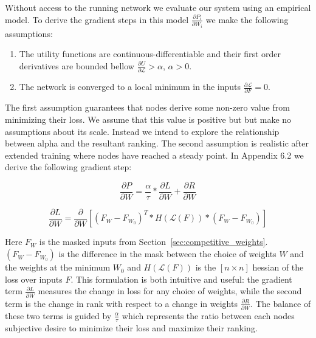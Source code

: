 \documentclass{article}
\begin{document}
Without access to the running network we evaluate our system using an empirical model. To derive the gradient steps in this model $\frac{\partial P_i}{\partial W_i}$ we make the following assumptions: 

\begin{enumerate}
	\item The utility functions are continuous-differentiable and their first order derivatives are bounded bellow $\frac{\partial U}{\partial \mathcal{L}} > \alpha$, $\alpha > 0$.     
	\item  The network is converged to a local minimum in the inputs $\frac{\partial\mathcal{L}}{\partial F} = 0$.
\end{enumerate}  

The first assumption guarantees that nodes derive some non-zero value from minimizing their loss. We assume that this value is positive but but make no assumptions about its scale. Instead we intend to explore the relationship between alpha and the resultant ranking. The second assumption is realistic after extended training where nodes have reached a steady point. In Appendix 6.2 we derive the following gradient step:

\begin{equation}
\label{eq:iterative_descent1}
\frac{\partial P}{\partial W} = \frac{\alpha}{\tau} * \frac{\partial L}{\partial W} + \frac{\partial R}{\partial W}
\end{equation}


\begin{equation}
\label{eq:iterative_descent2}
\frac{\partial L}{\partial W} = \frac{\partial}{\partial W} [(F_W - F_{W_0})^T * H( \mathcal{L}(F)) * (F_W - F_{W_0})] 
\end{equation}

Here $F_W$ is the masked inputs from Section~\ref{sec:competitive_weights}. $(F_W - F_{W_0})$ is the difference in the mask between the choice of weights $W$ and the weights at the minimum $W_0$ and $H( \mathcal{L}(F))$ is the $[n \times n]$ hessian of the loss over inputs $F$. This formulation is both intuitive and useful: the gradient term $\frac{\partial L}{\partial W}$ measures the change in loss for any choice of weights, while the second term is the change in rank with respect to a change in weights $\frac{\partial R}{\partial W}$. The balance of these two terms is guided by $\frac{\alpha}{\tau}$ which represents the ratio between each nodes subjective desire to minimize their loss and maximize their ranking.
\end{document}

